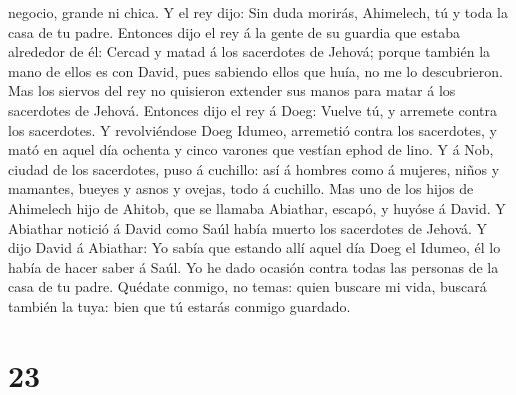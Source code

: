 negocio, grande ni chica.  Y el rey dijo: Sin duda morirás,
Ahimelech, tú y toda la casa de tu padre.  Entonces dijo el
rey á la gente de su guardia que estaba alrededor de él: Cercad y matad
á los sacerdotes de Jehová; porque también la mano de ellos es con
David, pues sabiendo ellos que huía, no me lo descubrieron. Mas los
siervos del rey no quisieron extender sus manos para matar á los
sacerdotes de Jehová.  Entonces dijo el rey á Doeg: Vuelve
tú, y arremete contra los sacerdotes. Y revolviéndose Doeg Idumeo,
arremetió contra los sacerdotes, y mató en aquel día ochenta y cinco
varones que vestían ephod de lino.  Y á Nob, ciudad de los
sacerdotes, puso á cuchillo: así á hombres como á mujeres, niños y
mamantes, bueyes y asnos y ovejas, todo á cuchillo.  Mas
uno de los hijos de Ahimelech hijo de Ahitob, que se llamaba Abiathar,
escapó, y huyóse á David.  Y Abiathar notició á David como
Saúl había muerto los sacerdotes de Jehová.  Y dijo David á
Abiathar: Yo sabía que estando allí aquel día Doeg el Idumeo, él lo
había de hacer saber á Saúl. Yo he dado ocasión contra todas las
personas de la casa de tu padre.  Quédate conmigo, no
temas: quien buscare mi vida, buscará también la tuya: bien que tú
estarás conmigo guardado.

\hypertarget{section-22}{%
\section{23}\label{section-22}}

